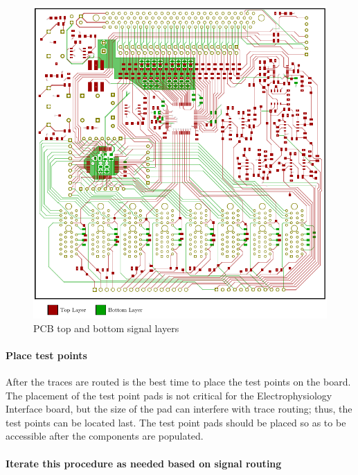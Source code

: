 \begin{figure}[htb]
	\begin{singlespace}
	\centering 
		\includegraphics{./figures/PCBCopperTopBot} 
	\caption{PCB top and bottom signal layers\label{fig:PCBTopBot}}
	\end{singlespace}
\end{figure}
	
\paragraph{Place test points}

After the traces are routed is the best time to place the test points on the board.  The placement of the test point pads is not critical for the Electrophysiology Interface board, but the size of the pad can interfere with trace routing; thus, the test points can be located last.  The test point pads should be placed so as to be accessible after the components are populated.
	
\paragraph{Iterate this procedure as needed based on signal routing}

